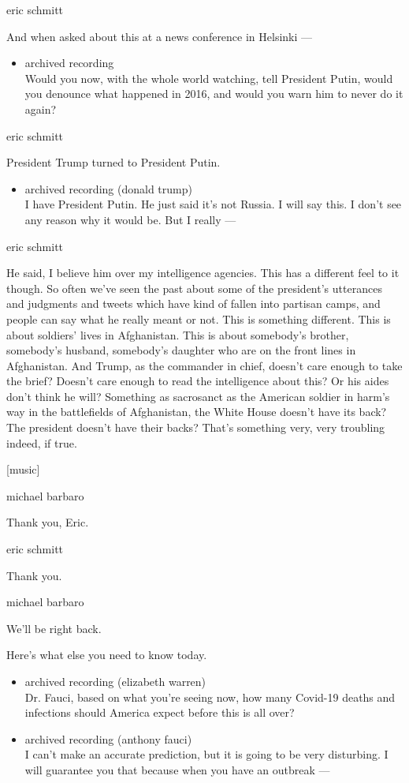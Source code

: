 eric schmitt

And when asked about this at a news conference in Helsinki ---

\begin{itemize}
\tightlist
\item
  archived recording\\
  Would you now, with the whole world watching, tell President Putin,
  would you denounce what happened in 2016, and would you warn him to
  never do it again?
\end{itemize}

eric schmitt

President Trump turned to President Putin.

\begin{itemize}
\tightlist
\item
  archived recording (donald trump)\\
  I have President Putin. He just said it's not Russia. I will say this.
  I don't see any reason why it would be. But I really ---
\end{itemize}

eric schmitt

He said, I believe him over my intelligence agencies. This has a
different feel to it though. So often we've seen the past about some of
the president's utterances and judgments and tweets which have kind of
fallen into partisan camps, and people can say what he really meant or
not. This is something different. This is about soldiers' lives in
Afghanistan. This is about somebody's brother, somebody's husband,
somebody's daughter who are on the front lines in Afghanistan. And
Trump, as the commander in chief, doesn't care enough to take the brief?
Doesn't care enough to read the intelligence about this? Or his aides
don't think he will? Something as sacrosanct as the American soldier in
harm's way in the battlefields of Afghanistan, the White House doesn't
have its back? The president doesn't have their backs? That's something
very, very troubling indeed, if true.

{[}music{]}

michael barbaro

Thank you, Eric.

eric schmitt

Thank you.

michael barbaro

We'll be right back.

Here's what else you need to know today.

\begin{itemize}
\item
  archived recording (elizabeth warren)\\
  Dr. Fauci, based on what you're seeing now, how many Covid-19 deaths
  and infections should America expect before this is all over?
\item
  archived recording (anthony fauci)\\
  I can't make an accurate prediction, but it is going to be very
  disturbing. I will guarantee you that because when you have an
  outbreak ---
\end{itemize}


